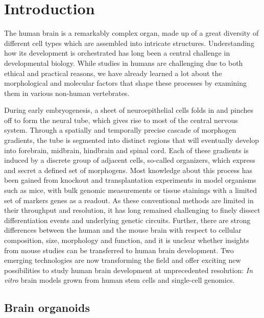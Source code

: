 \thispagestyle{plain}
\section{Introduction}




The human brain is a remarkably complex organ, made up of a great diversity of different cell types which are assembled into intricate structures. Understanding how its development is orchestrated has long been a central challenge in developmental biology. While studies in humans are challenging due to both ethical and practical reasons, we have already learned a lot about the morphological and molecular factors that shape these processes by examining them in various non-human vertebrates.

During early embryogenesis, a sheet of neuroepithelial cells folds in and pinches off to form the neural tube, which gives rise to most of the central nervous system. Through a spatially and temporally precise cascade of morphogen gradients, the tube is segmented into distinct regions that will eventually develop into forebrain, midbrain, hindbrain and spinal cord. Each of these gradients is induced by a discrete group of adjacent cells, so-called organizers, which express and secret a defined set of morphogens. Most knowledge about this process has been gained from knockout and transplantation experiments in model organisms such as mice, with bulk genomic measurements or tissue stainings with a limited set of markers genes as a readout. As these conventional methods are limited in their throughput and resolution, it has long remained challenging to finely dissect differentiation events and underlying genetic circuits. Further, there are strong differences between the human and the mouse brain with respect to cellular composition, size, morphology and function, and it is unclear whether insights from mouse studies can be transferred to human brain development. Two emerging technologies are now transforming the field and offer exciting new possibilities to study human brain development at unprecedented resolution: ​\textit{In vitro} brain models grown from human stem cells and single-cell genomics.





\subsection{Brain organoids}

